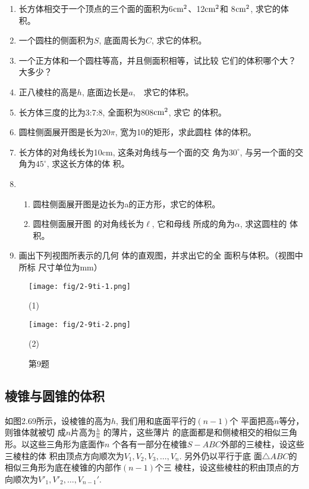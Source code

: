 \begin{ex}
\begin{enumerate}
    \item 长方体相交于一个顶点的三个面的面积为6${\rm cm^2}$、12${\rm cm^2}$和
    8${\rm cm^2}$, 求它的体积。
    \item 一个圆柱的侧面积为$S$, 底面周长为$C$, 求它的体积。
    \item 一个正方体和一个圆柱等高，并且侧面积相等，试比较
    它们的体积哪个大？大多少？
    \item 正八棱柱的高是$h$, 底面边长是$a$,　求它的体积。
    \item 
    长方体三度的比为3:7:8, 全面积为808${\rm cm^2}$, 求它
    的体积。
    \item 
    圆柱侧面展开图是长为$20\pi$, 宽为10的矩形，求此圆柱
    体的体积。
    \item 长方体的对角线长为10cm, 这条对角线与一个面的交
    角为$30^{\circ}$, 与另一个面的交角为$45^{\circ}$, 求这长方体的体
    积。
\item \begin{enumerate}
    \item 圆柱侧面展开图是边长为a的正方形，求它的体积。
    \item 圆柱侧面展开图
的对角线长为$\ell$, 它和母线
所成的角为$\alpha$, 求这圆柱的
体积。
\end{enumerate}

\item 画出下列视图所表示的几何
体的直观图，并求出它的全
面积与体积。（视图中所标
尺寸单位为mm）
\end{enumerate}
\end{ex}

\begin{figure}[htp]\centering
    \begin{minipage}[t]{0.48\textwidth}
    \centering
\texttt{[image: fig/2-9ti-1.png]}
    \caption*{(1)}
    \end{minipage}
    \begin{minipage}[t]{0.48\textwidth}
    \centering
\texttt{[image: fig/2-9ti-2.png]}
    \caption*{(2)}
    \end{minipage}
    \caption*{第9题}
    \end{figure}


\subsection{棱锥与圆锥的体积}

如图2.69所示，设棱锥的高为$h$, 
我们用和底面平行的$(n-1)$个
平面把高$n$等分，则锥体就被切
成$n$片高为$\frac{h}{n}$
的薄片，这些薄片
的底面都是和侧棱相交的相似三角形。以这些三角形为底面作$n$
个各有一部分在棱锥$S-ABC$外部的三棱柱，设这些三棱柱的体
积由顶点方向顺次为$V_1,V_2,V_3,\ldots,V_n$. 另外仍以平行于底
面$\triangle ABC$的相似三角形为底在棱锥的内部作$(n-1)$个三
棱柱，设这些棱柱的积由顶点的方向顺次为$V'_1,V'_2,\ldots,V_{n-1}'$.

